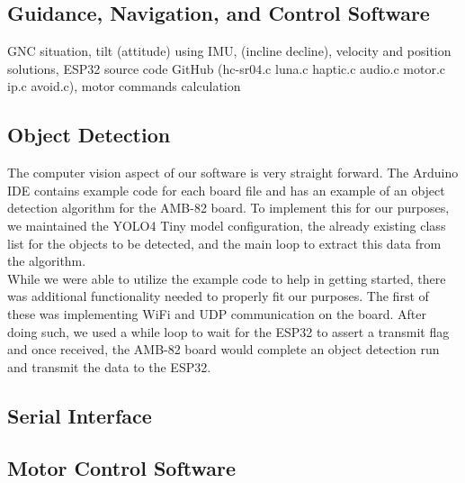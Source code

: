 \subsection{Guidance, Navigation, and Control Software}
\noindent GNC situation, tilt (attitude) using IMU, (incline decline), velocity and position solutions, ESP32 source code GitHub (hc-sr04.c luna.c haptic.c audio.c motor.c ip.c avoid.c), motor commands calculation\\

\subsection{Object Detection}
\noindent The computer vision aspect of our software is very straight forward. The Arduino IDE contains example code for each board file and has an example of an object detection algorithm for the AMB-82 board. To implement this for our purposes, we maintained the YOLO4 Tiny model configuration, the already existing class list for the objects to be detected, and the main loop to extract this data from the algorithm. \\

\noindent While we were able to utilize the example code to help in getting started, there was additional functionality needed to properly fit our purposes. The first of these was implementing WiFi and UDP communication on the board. After doing such, we used a while loop to wait for the ESP32 to assert a transmit flag and once received, the AMB-82 board would complete an object detection run and transmit the data to the ESP32. \\

\subsection{Serial Interface}

\subsection{Motor Control Software}


\\